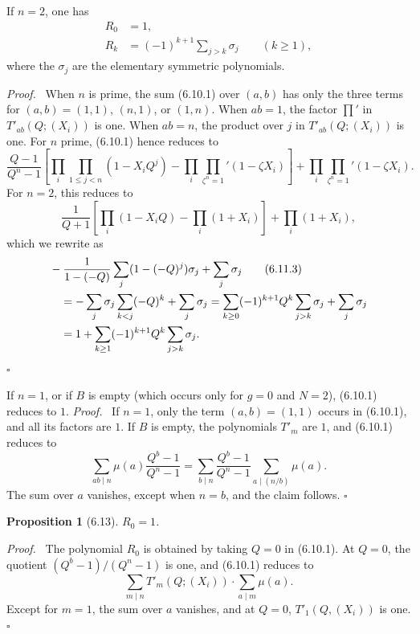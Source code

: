 \documentclass[10pt]{article}
\theoremstyle{deligne}
\newtheorem*{proposition*}{Proposition}
\newenvironment{proofdel}[1][Proof.]{\textit{#1}\ }{\hfill$\square$}
\newcommand{\heading}[1]{\vspace{0.7em}\noindent{\bfseries #1}\quad}
\begin{document}
\heading{Example 6.11.} If $n=2$, one has
\begin{align}
R_0&=1,\tag{6.11.1}\\
R_k&=(-1)^{k+1}\sum_{j>k}\sigma_j \qquad (k\ge1),\tag{6.11.2}
\end{align}
where the $\sigma_j$ are the elementary symmetric polynomials.

\begin{proofdel}
When $n$ is prime, the sum (6.10.1) over $(a,b)$ has only the three terms for $(a,b)=(1,1)$, $(n,1)$, or $(1,n)$. When $ab=1$, the factor $\prod'$ in $T'_{ab}(Q;(X_i))$ is one. When $ab=n$, the product over $j$ in $T'_{ab}(Q;(X_i))$ is one. For $n$ prime, (6.10.1) hence reduces to
\begin{equation}\tag{6.11.1}
\frac{Q-1}{Q^n-1}\left[\prod_i\prod_{1\le j<n}(1-X_iQ^j)-\prod_i\prod_{\zeta^n=1}'(1-\zeta X_i)\right]
+\prod_i\prod_{\zeta^n=1}'(1-\zeta X_i).
\end{equation}
For $n=2$, this reduces to
\begin{equation}\tag{6.11.2}
\frac{1}{Q+1}\left[\prod_i(1-X_iQ)-\prod_i(1+X_i)\right]+\prod_i(1+X_i),
\end{equation}
which we rewrite as
\begin{align}
&-\frac{1}{1-(-Q)}\sum_j(1-(-Q)^j)\sigma_j+\sum_j\sigma_j\tag{6.11.3}\\
&\quad=-\sum_j\sigma_j\sum_{k<j}(-Q)^k+\sum_j\sigma_j
=\sum_{k\ge0}(-1)^{k+1}Q^k\sum_{j>k}\sigma_j+\sum_j\sigma_j\notag\\
&\quad=1+\sum_{k\ge1}(-1)^{k+1}Q^k\sum_{j>k}\sigma_j.\notag
\end{align}
\end{proofdel}

\heading{Example 6.12.} If $n=1$, or if $B$ is empty (which occurs only for $g=0$ and $N=2$), (6.10.1) reduces to $1$.
\begin{proofdel}
If $n=1$, only the term $(a,b)=(1,1)$ occurs in (6.10.1), and all its factors are $1$. If $B$ is empty, the polynomials $T'_m$ are $1$, and (6.10.1) reduces to
\[
\sum_{ab\mid n}\mu(a)\frac{Q^b-1}{Q^n-1}
=\sum_{b\mid n}\frac{Q^b-1}{Q^n-1}\sum_{a\mid(n/b)}\mu(a).
\]
The sum over $a$ vanishes, except when $n=b$, and the claim follows.
\end{proofdel}

\begin{proposition*}[6.13]
$R_0=1$.
\end{proposition*}
\begin{proofdel}
The polynomial $R_0$ is obtained by taking $Q=0$ in (6.10.1). At $Q=0$, the quotient $(Q^b-1)/(Q^n-1)$ is one, and (6.10.1) reduces to
\[
\sum_{m\mid n}T'_m(Q;(X_i))\cdot\sum_{a\mid m}\mu(a).
\]
Except for $m=1$, the sum over $a$ vanishes, and at $Q=0$, $T'_1(Q,(X_i))$ is one.
\end{proofdel}
\end{document}
